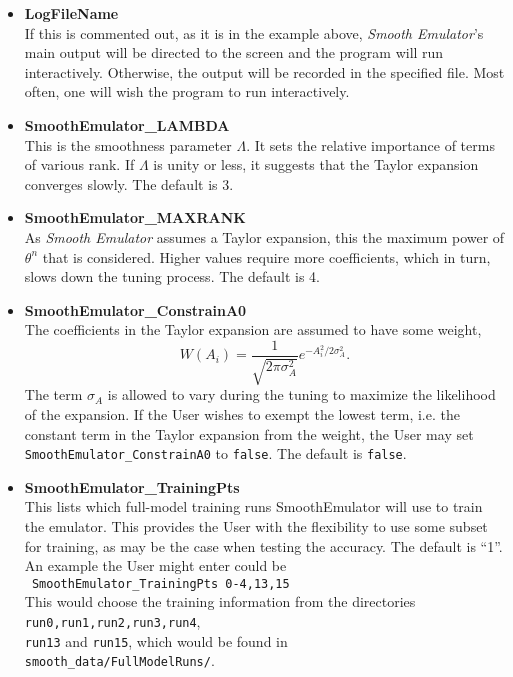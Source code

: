 \documentclass[UserManual.tex]{subfiles}
\begin{document}
\begin{itemize}\itemsep 0pt
\item {\bf LogFileName}\\
If this is commented out, as it is in the example above, {\it Smooth Emulator}'s main output will be directed to the screen and the program will run interactively. Otherwise, the output will be recorded in the specified file. Most often, one will wish the program to run interactively.

\item {\bf SmoothEmulator\_LAMBDA}\\
This is the smoothness parameter $\Lambda$. It sets the relative importance of terms of various rank. If $\Lambda$ is unity or less, it suggests that the Taylor expansion converges slowly. The default is 3.

\item {\bf SmoothEmulator\_MAXRANK}\\
As {\it Smooth Emulator} assumes a Taylor expansion, this the maximum power of $\theta^n$ that is considered. Higher values require more coefficients, which in turn, slows down the tuning process. The default is 4.

\item {\bf SmoothEmulator\_ConstrainA0}\\
The coefficients in the Taylor expansion are assumed to have some weight,
\[
W(A_i)=\frac{1}{\sqrt{2\pi\sigma_A^2}}e^{-A_i^2/2\sigma_A^2}.
\]
The term $\sigma_A$ is allowed to vary during the tuning to maximize the likelihood of the expansion. If the User wishes to exempt the lowest term, i.e. the constant term in the Taylor expansion from the weight, the User may set {\tt SmoothEmulator\_ConstrainA0} to {\tt false}. The default is {\tt false}.

\item {\bf SmoothEmulator\_TrainingPts}\\
This lists which full-model training runs SmoothEmulator will use to train the emulator. This provides the User with the flexibility to use some subset for training, as may be the case when testing the accuracy. The default is ``1''. An example the User might enter could be\\
{\tt ~SmoothEmulator\_TrainingPts  0-4,13,15}\\
This would choose the training information from the directories {\tt run0,run1,run2,run3,run4},\\{\tt run13} and {\tt run15}, which would be found in \\{\tt smooth\_data/FullModelRuns/}.


\end{itemize}
\end{document}
